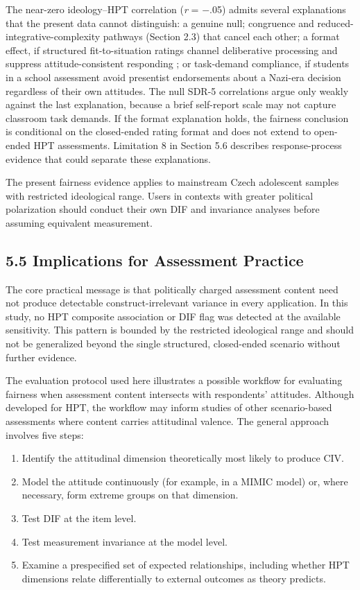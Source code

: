 \documentclass[PCJ,Unicode,screen,mode=plain]{cedram}
\providecommand{\tightlist}{%
  \setlength{\itemsep}{0pt}\setlength{\parskip}{0pt}}
\begin{document}
The near-zero ideology--HPT correlation (\emph{r} = $-$.05) admits several
explanations that the present data cannot distinguish: a genuine null;
congruence and reduced-integrative-complexity pathways (Section 2.3) that
cancel each other; a format effect, if structured fit-to-situation ratings
channel deliberative processing and suppress attitude-consistent responding
\citep{Evans2013}; or task-demand compliance, if students in a school
assessment avoid presentist endorsements about a Nazi-era decision regardless
of their own attitudes. The null SDR-5 correlations argue only weakly against
the last explanation, because a brief self-report scale may not capture
classroom task demands. If the format explanation holds, the fairness
conclusion is conditional on the closed-ended rating format and does not
extend to open-ended HPT assessments. Limitation 8 in Section 5.6 describes
response-process evidence that could separate these explanations.

The present fairness evidence applies to mainstream Czech adolescent
samples with restricted ideological range. Users in contexts with
greater political polarization should conduct their own DIF and
invariance analyses before assuming equivalent measurement.

\subsection*{5.5 Implications for Assessment Practice}\label{implications-for-assessment-practice}

The core practical message is that politically charged assessment content need
not produce detectable construct-irrelevant variance in every application. In
this study, no HPT composite association or DIF flag was detected at the
available sensitivity. This pattern is bounded by the restricted ideological
range and should not be generalized beyond the single structured,
closed-ended scenario without further evidence.

The evaluation protocol used here illustrates a possible workflow for
evaluating fairness when assessment content intersects with respondents'
attitudes. Although developed for HPT, the workflow may inform studies of
other scenario-based assessments where content carries attitudinal valence.
The general approach involves five steps:

\begin{enumerate}
\def\labelenumi{\arabic{enumi}.}
\tightlist
\item
  Identify the attitudinal dimension theoretically most likely to produce CIV.
\item
  Model the attitude continuously (for example, in a MIMIC model) or, where
  necessary, form extreme groups on that dimension.
\item
  Test DIF at the item level.
\item
  Test measurement invariance at the model level.
\item
  Examine a prespecified set of expected relationships, including whether HPT dimensions relate differentially to external outcomes as theory predicts.
\end{enumerate}
\end{document}

